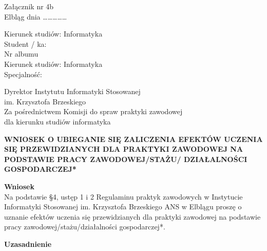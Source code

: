 \documentclass[11pt,a4paper]{article}
\begin{document}
\begin{flushright}
Załącznik nr 4b \\[2em]
Elbląg dnia \dots\dots\dots\dots\dots
\end{flushright}

\vspace{1em}

\noindent
\begin{minipage}[t]{0.4\textwidth}
Kierunek studiów: Informatyka \\
Student / ka: \dotfill \\
Nr albumu \dotfill \\
Kierunek studiów: Informatyka \\
Specjalność: \dotfill
\end{minipage}
\hfill
\begin{minipage}[t]{0.55\textwidth}
\begin{flushright}
Dyrektor Instytutu Informatyki Stosowanej \\
im. Krzysztofa Brzeskiego \\[0.5em]
Za pośrednictwem Komisji do spraw praktyki zawodowej \\
dla kierunku studiów informatyka
\end{flushright}
\end{minipage}

\vspace{3em}

\begin{center}
\textbf{\large WNIOSEK O UBIEGANIE SIĘ ZALICZENIA EFEKTÓW UCZENIA SIĘ PRZEWIDZIANYCH DLA PRAKTYKI ZAWODOWEJ NA PODSTAWIE PRACY ZAWODOWEJ/STAŻU/ DZIAŁALNOŚCI GOSPODARCZEJ*}
\end{center}

\vspace{1em}

\noindent \textbf{Wniosek} \\[0.5em]
Na podstawie \S 4, ustęp 1 i 2 Regulaminu praktyk zawodowych w Instytucie Informatyki Stosowanej im. Krzysztofa Brzeskiego ANS w Elblągu proszę o uznanie efektów uczenia się przewidzianych dla praktyki zawodowej na podstawie pracy zawodowej/stażu/działalności gospodarczej*.

\vspace{1em}

\noindent \textbf{Uzasadnienie} \\
\dotfill \\
\dotfill \\
\dotfill \\
\dotfill
\end{document}
